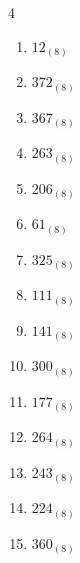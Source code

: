 \begin{multicols}{4}
\begin{enumerate}
        \phantom{$=101$}

  \item $12_{(8)}$

        \phantom{$=10$}

  \item $372_{(8)}$

        \phantom{$=250$}

  \item $367_{(8)}$

        \phantom{$=247$}

  \item $263_{(8)}$

        \phantom{$=179$}

  \item $206_{(8)}$

        \phantom{$=134$}

\columnbreak %

\resetques

  \item $61_{(8)}$

        \phantom{$=49$}

  \item $325_{(8)}$

        \phantom{$=213$}

  \item $111_{(8)}$

        \phantom{$=73$}

  \item $141_{(8)}$

        \phantom{$=97$}

  \item $300_{(8)}$

        \phantom{$=192$}

  \item $177_{(8)}$

        \phantom{$=127$}

  \item $264_{(8)}$

        \phantom{$=180$}

  \item $243_{(8)}$

        \phantom{$=163$}

  \item $224_{(8)}$

        \phantom{$=148$}

  \item $360_{(8)}$


\end{enumerate}
\end{multicols}
